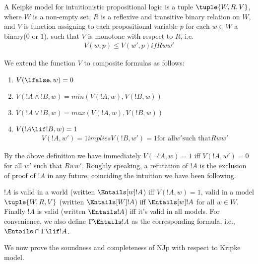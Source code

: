 \documentclass[../../../include/open-logic-section]{subfiles}
\begin{document}

\begin{defn}
  A Keipke model for intuitionistic propositional logic is a tuple
  $\tuple{W, R, V}$, where $W$ is a non-empty
  set, $R$ is a reflexive and transitive binary relation on $W$, and
  $V$ is function assigning to each propositional variable $p$ for each $w
  \in W$ a binary($0$ or $1$), such that $V$ is monotone with respect
  to $R$, i.e.
  \begin{gather*}
    V(w,p) \le V(w',p) if R w w'
  \end{gather*}
\end{defn}

\begin{defn}
  We extend the function $V$ to composite formulas as follows:
  \begin{enumerate}
  \item $V(\lfalse, w) = 0$
  \item $V(!A \land !B, w) = min(V(!A, w), V(!B, w))$
  \item $V(!A \lor !B, w) = max(V(!A, w), V(!B, w))$
  \item $V(!A \lif !B, w) = 1$ 
    \begin{gather*}
      V(!A, w')=1 implies V(!B, w')=1 \text{for all} w' \text{such
        that} R w w'
    \end{gather*}
  \end{enumerate}
\end{defn}

By the above definition we have immediately $V(\lnot !A, w)=1$ iff
$V(!A, w')=0$ for all $w'$ such that $R w w'$. Roughly speaking, a
refutation of $!A$ is the exclusion of proof of $!A$ in any future,
coinciding the intuition we have been following.

\begin{defn}
  $!A$ is valid in a world (written $\Entails[w] !A$) iff $V(!A,
  w) = 1$, valid in a model $\tuple{W,R,V}$ (written $\Entails[W] !A$) iff $\Entails[w] !A$ for all $w
  \in W$. Finally $!A$ is valid (written $\Entails !A$) iff it's valid
  in all models. For convenience, we also define $\Gamma \Entails !A$
  as the corresponding formula, i.e., $\Entails \cap \Gamma \lif !A$.
\end{defn}

We now prove the soundness and completeness of NJp with respect to
Kripke model.
\end{document}
